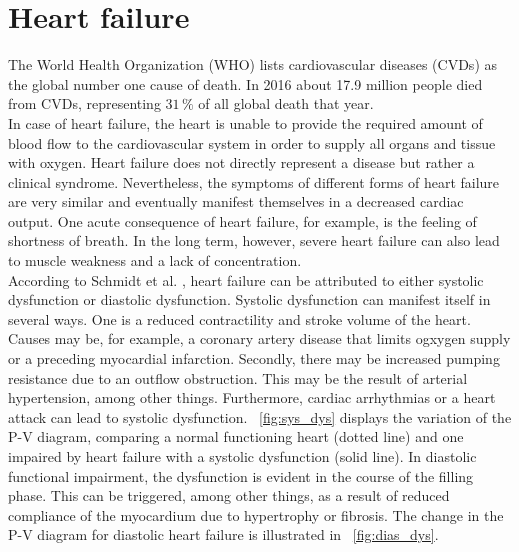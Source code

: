 \section{Heart failure}
The World Health Organization (WHO) lists cardiovascular diseases (CVDs) as the global number one cause of death. In 2016 about 17.9 million people died from CVDs, representing $31 \,\%$ of all global death that year. \cite{WHO}
\\In case of heart failure, the heart is unable to provide the required amount of blood flow to the cardiovascular system in order to supply all organs and tissue with oxygen.
Heart failure does not directly represent a disease but rather a clinical syndrome. Nevertheless, the symptoms of different forms of heart failure are very similar and eventually manifest themselves in a decreased cardiac output. One acute consequence of heart failure, for example, is the feeling of shortness of breath. In the long term, however, severe heart failure can also lead to muscle weakness and a lack of concentration.
\\According to Schmidt et al. \cite{HKS4}, heart failure can be attributed to either systolic dysfunction or diastolic dysfunction. Systolic dysfunction can manifest itself in several ways. One is a reduced contractility and stroke volume of the heart. Causes may be, for example, a coronary artery disease that limits ogxygen supply or a preceding myocardial infarction. Secondly, there may be increased pumping resistance due to an outflow obstruction.  This may be the result of arterial hypertension, among other things. Furthermore, cardiac arrhythmias or a heart attack can lead to systolic dysfunction. \figurename~\ref{fig:sys_dys} displays the variation of the P-V diagram, comparing a normal functioning heart (dotted line) and one impaired by heart failure with a systolic dysfunction (solid line). In diastolic functional impairment, the dysfunction is evident in the course of the filling phase. This can be triggered, among other things, as a result of reduced compliance of the myocardium due to hypertrophy or fibrosis. The change in the P-V diagram for diastolic heart failure is illustrated in \figurename~\ref{fig:dias_dys}.
